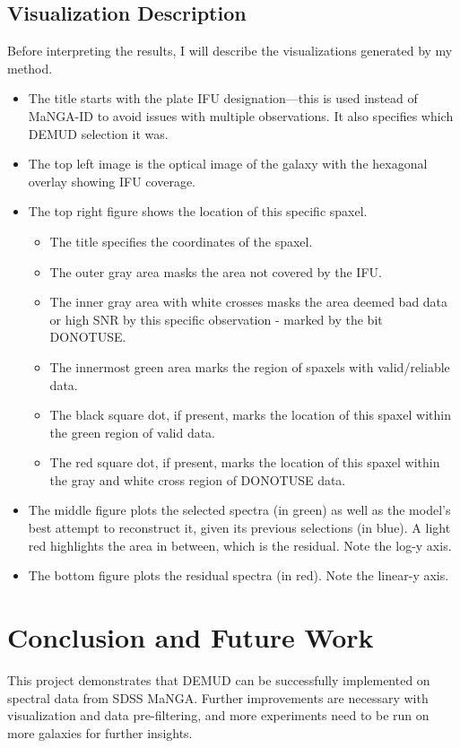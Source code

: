 \documentclass[10pt, letterpaper, notitlepage]{article}
\begin{document}
\subsection{Visualization Description}
Before interpreting the results, I will describe the visualizations generated by my method.
\begin{itemize}
	\item The title starts with the plate IFU designation---this is used instead of MaNGA-ID to avoid issues with multiple observations. It also specifies which DEMUD selection it was.
	\item The top left image is the optical image of the galaxy with the hexagonal overlay showing IFU coverage.
	\item The top right figure shows the location of this specific spaxel.
	\begin{itemize}
		\item The title specifies the coordinates of the spaxel.
		\item The outer gray area masks the area not covered by the IFU.
		\item The inner gray area with white crosses masks the area deemed bad data or high SNR by this specific observation - marked by the bit DONOTUSE.
		\item The innermost green area marks the region of spaxels with valid/reliable data.
		\item The black square dot, if present, marks the location of this spaxel within the green region of valid data.
		\item The red square dot, if present, marks the location of this spaxel within the gray and white cross region of DONOTUSE data.
	\end{itemize}
	\item The middle figure plots the selected spectra (in green) as well as the model's best attempt to reconstruct it,
	given its previous selections (in blue). A light red highlights the area in between, which is the residual. Note the log-y axis.
	\item The bottom figure plots the residual spectra (in red). Note the linear-y axis.
\end{itemize}

\section{Conclusion and Future Work}

This project demonstrates that DEMUD can be successfully implemented on spectral data from SDSS MaNGA. Further improvements
are necessary with visualization and data pre-filtering, and more experiments need to be run on more galaxies for further
insights.

\newpage


\end{document}
